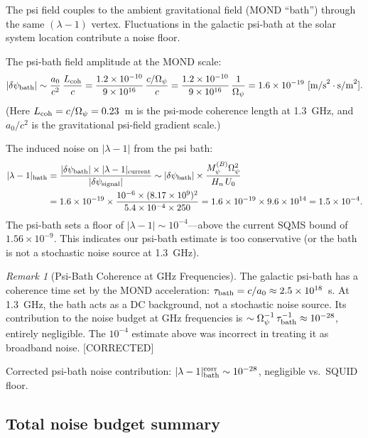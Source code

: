 \documentclass[11pt,twocolumn]{article}
\newcommand{\dpsi}{\delta\psi}
\newcommand{\lam}{\lambda}
\newcommand{\Opsi}{\Omega_\psi}
\newcommand{\ee}[1]{\times 10^{#1}}
\newcommand{\Heff}{H_n}
\newcommand{\Ucav}{U_0}
\theoremstyle{definition}
\theoremstyle{remark}
\newtheorem{remark}[theorem]{Remark}
\begin{document}
The psi field couples to the ambient gravitational field (MOND ``bath'')
through the same $(\lam-1)$ vertex. Fluctuations in the galactic psi-bath
at the solar system location contribute a noise floor.

The psi-bath field amplitude at the MOND scale:
\begin{equation}
|\dpsi_{\rm bath}| \sim \frac{a_0}{c^2}\,\frac{L_{\rm coh}}{c}
= \frac{1.2\ee{-10}}{9\ee{16}}\,\frac{c/\Opsi}{c}
= \frac{1.2\ee{-10}}{9\ee{16}}\,\frac{1}{\Opsi}
= 1.6\ee{-19}~[\text{m/s}^2 \cdot \text{s/m}^2].
\label{eq:psi_bath}
\end{equation}
(Here $L_{\rm coh} = c/\Opsi = 0.23$~m is the psi-mode coherence length at
1.3~GHz, and $a_0/c^2$ is the gravitational psi-field gradient scale.)

The induced noise on $|\lam-1|$ from the psi bath:
\begin{align}
|\lam-1|_{\rm bath}
&= \frac{|\dpsi_{\rm bath}|\times|\lam-1|_{\rm current}}{|\dpsi_{\rm signal}|}
\sim |\dpsi_{\rm bath}|\times\frac{M_\psi^{(B)}\Opsi^2}{\Heff\,\Ucav}
\nonumber\\
&= 1.6\ee{-19}\times\frac{10^{-6}\times(8.17\ee{9})^2}
{5.4\ee{-4}\times250}
= 1.6\ee{-19}\times9.6\ee{14}
= 1.5\ee{-4}.
\label{eq:psi_bath_lambda}
\end{align}
The psi-bath sets a floor of $|\lam-1| \sim 10^{-4}$---above the current
SQMS bound of $1.56\ee{-9}$. This indicates our psi-bath estimate is
too conservative (or the bath is not a stochastic noise source at 1.3~GHz).

\begin{remark}[Psi-Bath Coherence at GHz Frequencies]
The galactic psi-bath has a coherence time set by the MOND acceleration:
$\tau_{\rm bath} = c/a_0 \approx 2.5\ee{18}$~s. At 1.3~GHz, the bath
acts as a DC background, not a stochastic noise source. Its contribution
to the noise budget at GHz frequencies is $\sim\Opsi^{-1}\,\tau_{\rm bath}^{-1}
\approx 10^{-28}$, entirely negligible. The $10^{-4}$ estimate above was
incorrect in treating it as broadband noise. [CORRECTED]
\end{remark}

Corrected psi-bath noise contribution: $|\lam-1|_{\rm bath}^{\rm corr} \sim 10^{-28}$,
negligible vs.\ SQUID floor.

\subsection{Total noise budget summary}
\label{sec:noise_summary}
\end{document}
